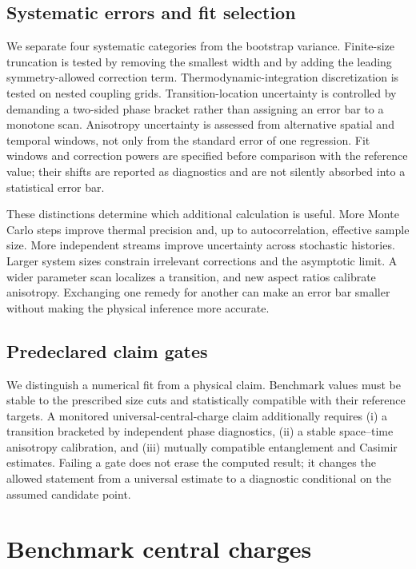 \documentclass[aps,prb,reprint,superscriptaddress,longbibliography,floatfix]{revtex4-2}
\begin{document}
\subsection{Systematic errors and fit selection}
\label{sec:systematic-errors}

We separate four systematic categories from the bootstrap variance.
Finite-size truncation is tested by removing the smallest width and by adding
the leading symmetry-allowed correction term.  Thermodynamic-integration
discretization is tested on nested coupling grids.  Transition-location
uncertainty is controlled by demanding a two-sided phase bracket rather than
assigning an error bar to a monotone scan.  Anisotropy uncertainty is assessed
from alternative spatial and temporal windows, not only from the standard
error of one regression.  Fit windows and correction powers are specified
before comparison with the reference value; their shifts are reported as
diagnostics and are not silently absorbed into a statistical error bar.

These distinctions determine which additional calculation is useful.  More
Monte Carlo steps improve thermal precision and, up to autocorrelation,
effective sample size.  More independent streams improve uncertainty across
stochastic histories.  Larger system sizes constrain irrelevant corrections
and the asymptotic limit.  A wider parameter scan localizes a transition, and
new aspect ratios calibrate anisotropy.  Exchanging one remedy for another can
make an error bar smaller without making the physical inference more accurate.

\subsection{Predeclared claim gates}

We distinguish a numerical fit from a physical claim.  Benchmark values must
be stable to the prescribed size cuts and statistically compatible with their
reference targets.  A monitored universal-central-charge claim additionally
requires (i) a transition bracketed by independent phase diagnostics,
(ii) a stable space--time anisotropy calibration, and (iii) mutually
compatible entanglement and Casimir estimates.  Failing a gate does not erase
the computed result; it changes the allowed statement from a universal
estimate to a diagnostic conditional on the assumed candidate point.

\section{Benchmark central charges}
\label{sec:benchmarks}
\end{document}

